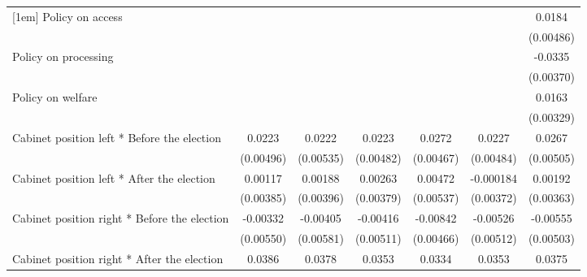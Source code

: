 \begin{table}[htbp]
\begin{tabular}{l*{6}{c}}
[1em]
Policy on access    &                     &                     &                     &                     &                     &      0.0184\sym{***}\\
                    &                     &                     &                     &                     &                     &   (0.00486)         \\
[1em]
Policy on processing&                     &                     &                     &                     &                     &     -0.0335\sym{***}\\
                    &                     &                     &                     &                     &                     &   (0.00370)         \\
[1em]
Policy on welfare   &                     &                     &                     &                     &                     &      0.0163\sym{***}\\
                    &                     &                     &                     &                     &                     &   (0.00329)         \\
[1em]
Cabinet position left * Before the election&      0.0223\sym{***}&      0.0222\sym{***}&      0.0223\sym{***}&      0.0272\sym{***}&      0.0227\sym{***}&      0.0267\sym{***}\\
                    &   (0.00496)         &   (0.00535)         &   (0.00482)         &   (0.00467)         &   (0.00484)         &   (0.00505)         \\
[1em]
Cabinet position left * After the election&     0.00117         &     0.00188         &     0.00263         &     0.00472         &   -0.000184         &     0.00192         \\
                    &   (0.00385)         &   (0.00396)         &   (0.00379)         &   (0.00537)         &   (0.00372)         &   (0.00363)         \\
[1em]
Cabinet position right * Before the election&    -0.00332         &    -0.00405         &    -0.00416         &    -0.00842         &    -0.00526         &    -0.00555         \\
                    &   (0.00550)         &   (0.00581)         &   (0.00511)         &   (0.00466)         &   (0.00512)         &   (0.00503)         \\
[1em]
Cabinet position right * After the election&      0.0386\sym{***}&      0.0378\sym{***}&      0.0353\sym{***}&      0.0334\sym{***}&      0.0353\sym{***}&      0.0375\sym{***}\\

\end{tabular}
\end{table}
